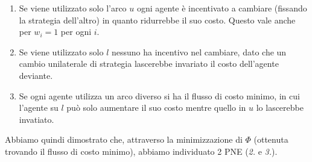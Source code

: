\documentclass{article}
\begin{document}
                \begin{enumerate}
                    \item Se viene utilizzato solo l'arco $ u $ ogni agente è incentivato a cambiare (fissando la strategia dell'altro) in quanto ridurrebbe il suo costo. Questo vale anche per $ w_i = 1 $ per ogni $ i $.
                    \item Se viene utilizzato solo $ l $ nessuno ha incentivo nel cambiare, dato che un cambio unilaterale di strategia lascerebbe invariato il costo dell'agente deviante.
                    \item Se ogni agente utilizza un arco diverso si ha il flusso di costo minimo, in cui l'agente su $ l $ può solo aumentare il suo costo mentre quello in $ u $ lo lascerebbe invatiato.
                \end{enumerate}
                Abbiamo quindi dimostrato che, attraverso la minimizzazione di $ \varPhi $ (ottenuta trovando il flusso di costo minimo), abbiamo individuato 2 PNE (\textit{2.} e \textit{3.}).
\end{document}
